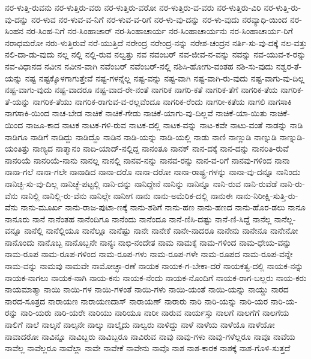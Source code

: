 {ನರ-ಳುತ್ತಿ-ರುವನು
ನರ-ಳುತ್ತಿರು-ವರು
ನರ-ಳುತ್ತಿರು-ವರೋ
ನರ-ಳುತ್ತಿರು-ವ-ವರು
ನರ-ಳುತ್ತಿರು-ವಿರಿ
ನರ-ಳುತ್ತಿ-ರು-ವು-ದನ್ನು
ನರ-ಳುವ
ನರ-ಳುವ-ವ-ನಿಗೆ
ನರ-ಳುವ-ವ-ರಿಗೆ
ನರ-ಳು-ವು-ದನ್ನು
ನರ-ಳು-ವುದು
ನರವ್ಯಾಧಿ-ಯಿಂದ
ನರ-ಸಿಂಹನ
ನರ-ಸಿಂಹ-ನಿಗೆ
ನರ-ಸಿಂಹಾಚಾರ್
ನರ-ಸಿಂಹಾಚಾರ್ಯ
ನರ-ಸಿಂಹಾಚಾರ್ಯನು
ನರ-ಸಿಂಹಾಚಾರ್ಯ-ರಿಗೆ
ನರಾಧಮರೋ
ನರು-ಳುತ್ತಿರುವೆ
ನರೆ-ಯುತ್ತಿದೆ
ನರೇಂದ್ರ
ನರೇಂದ್ರ-ನನ್ನು
ನರೇಶ-ಚಂದ್ರನ
ನರ್ತಿ-ಸು-ವು-ದಕ್ಕೆ
ನಲ-ವತ್ತು
ನಲಿ-ದಾ-ಡು-ವುದು
ನಲ್ಲ
ನಲ್ಲಿ
ನಲ್ಲಿ-ರುವ
ನಲ್ವತ್ತು
ನವ
ನವಂಬರ್
ನವ-ಜೀವ-ನ-ವನ್ನು
ನವನ್ನು
ನವ-ಯುವ-ಕ-ರನ್ನು
ನವ-ವಿಧಾನದ
ನವೀನ
ನವೀನ-ವಾಗಿ
ನವೆಂಬರ್
ನವೆಂಬರ್‌-ನಲ್ಲಿ
ನಶಿಸಿ-ಹೋಗು-ವಂತಹ
ನಶಿ-ಸು-ವುದು
ನಶ್ವರ-ತೆ-ಯನ್ನು
ನಷ್ಟ
ನಷ್ಟಕ್ಕೊಳಗಾಗುತ್ತೇವೆ
ನಷ್ಟ-ಗಳನ್ನೆಲ್ಲ
ನಷ್ಟ-ವನ್ನು
ನಷ್ಟ-ವಾಗಿ
ನಷ್ಟ-ವಾಗಿ-ರು-ವುದು
ನಷ್ಟ-ವಾಗು-ವು-ದಿಲ್ಲ
ನಷ್ಟ-ವಾಗು-ವುದು
ನಷ್ಟ-ವಾದರೂ
ನಷ್ಟ-ವಾದ-ರೇ-ನಂತೆ
ನಾಗರಿಕ
ನಾಗರಿ-ಕತೆ
ನಾಗರಿಕ-ತೆಗೆ
ನಾಗರಿಕ-ತೆಯ
ನಾಗರಿಕ-ತೆ-ಯನ್ನು
ನಾಗರಿಕ-ತೆಯು
ನಾಗರಿಕ-ರಾಗುವ-ವ-ರಲ್ಲವೆಂದೂ
ನಾಗರಿಕ-ರೆಂದು
ನಾಗರೀ-ಕತೆಯ
ನಾಗಲಿ
ನಾಗಸಾಕಿ
ನಾಗಸಾಕಿ-ಯಿಂದ
ನಾಚ-ಬೇಡ
ನಾಚಿಕೆ
ನಾಚಿಕೆ-ಗೇಡು
ನಾಚಿಕೆ-ಯಾಗು-ವು-ದಿಲ್ಲವೆ
ನಾಚಿಕೆ-ಯಾ-ಯಿತು
ನಾಚಿಕೆ-ಯಿಂದ
ನಾಜೂ-ಕಾದ
ನಾಟಕ
ನಾಟಕ-ಗಳಿ-ರುವ
ನಾಟಕ-ದಲ್ಲಿ
ನಾಟಕ-ವನ್ನು
ನಾಟ-ಕವೇ
ನಾಟು-ವಂತೆ
ನಾಡನ್ನು
ನಾಡಿ
ನಾಡಿಗೂ
ನಾಡಿಗೆ
ನಾಡಿದ್ದು
ನಾಡಿದ್ದೊ
ನಾಡಿನ
ನಾಡಿ-ಯನ್ನು
ನಾಡಿ-ಯಲ್ಲಿ
ನಾಡು
ನಾಣಿ
ನಾಣ್ಣುಡಿ
ನಾಣ್ನುಡಿ
ನಾಣ್ನುಡಿ-ಯಂತಿತ್ತು
ನಾಣ್ಯದ
ನಾತ್ಮಾನಂ
ನಾದಿ-ಯಾದ್‌-ನಲ್ಲಿದ್ದ
ನಾನಂತೂ
ನಾನಕ್
ನಾನ-ದಕ್ಕೆ
ನಾನ-ದನ್ನು
ನಾನರಿತಿ-ರುವೆ
ನಾನರಿಯೆ
ನಾನರಿಯೆ-ನಾನು
ನಾನಲ್ಲ
ನಾನಲ್ಲಿ
ನಾನವ-ನನ್ನು
ನಾನವ-ರನ್ನು
ನಾನ-ವ-ರಿಗೆ
ನಾನವು-ಗಳಿಂದ
ನಾನಾ
ನಾನಾ-ಗಲೆ
ನಾನಾ-ಗಲೇ
ನಾನಾಡಿದ
ನಾನಾ-ದರೊ
ನಾನಾ-ದರೋ
ನಾನಾ-ರಾಷ್ಟ್ರ-ಗಳನ್ನು
ನಾನಾ-ವು-ದನ್ನೂ
ನಾನಿಂದು
ನಾನಿಚ್ಛಿ-ಸು-ವು-ದಿಲ್ಲ
ನಾನಿಚ್ಛೆ-ಪಟ್ಟಲ್ಲಿ
ನಾನಿ-ದನ್ನು
ನಾನಿದ್ದೇನೆ
ನಾನಿನ್ನು
ನಾನಿನ್ನೂ
ನಾನಿ-ರುವ
ನಾನಿ-ರುವೆಡೆ
ನಾನಿ-ರು-ವೆನು
ನಾನಿಲ್ಲಿ
ನಾನಿಲ್ಲಿ-ರು-ವೆನು
ನಾನಿಲ್ಲೇ
ನಾನೀಗ
ನಾನು
ನಾನು-ಅಮೆರಿಕ-ದಲ್ಲಿ
ನಾನುಈ
ನಾನು-ನಿರೀಕ್ಷಿ-ಸುತ್ತಿ-ರು-ವೆನು
ನಾನು-ಮೂರ್ಖ
ನಾನು-ರಾಜ-ಪುಟಾ-ಣಕ್ಕೆ
ನಾನು-ಶಶಿಗೆ
ನಾನು-ಹಣ
ನಾನು-ಹಣದ
ನಾನು-ಹೊರ-ಡಲು
ನಾನೂ
ನಾನೂರು
ನಾನೆ
ನಾನೆಂತಹ
ನಾನೆಂದಿಗೂ
ನಾನೆಂದು
ನಾನೆಂದೂ
ನಾನೆ-ಣಿಸಿ-ದಷ್ಟು
ನಾನೆ-ಣಿ-ಸಿದ್ದೆ
ನಾನೆಲ್ಲ
ನಾನೆಲ್ಲ-ವನ್ನೂ
ನಾನೆಲ್ಲಿ
ನಾನೆಲ್ಲಿಯೂ
ನಾನೆಲ್ಲೂ
ನಾನೆಷ್ಟು
ನಾನೇ
ನಾನೇಕೆ
ನಾನೇ-ನಾದರೂ
ನಾನೇನು
ನಾನೇನೂ
ನಾನೇನೋ
ನಾನೊಂದು
ನಾನೊಬ್ಬ
ನಾನೊಬ್ಬನೇ
ನಾನ್ಯಃ
ನಾಭಿ-ನಂದೇತ
ನಾಮ
ನಾಮಕ್ಕೆ
ನಾಮ-ಗಳಿಂದ
ನಾಮ-ಧೇಯ-ವನ್ನು
ನಾಮ-ರೂಪ
ನಾಮ-ರೂಪ-ಗಳಿಂದ
ನಾಮ-ರೂಪ-ಗಳು
ನಾಮ-ರೂಪ-ಗಳೇ
ನಾಮ-ರೂಪದ
ನಾಮ-ರೂಪ-ವನ್ನೇ
ನಾಮ-ವನ್ನು
ನಾಮವು
ನಾಮವೇ
ನಾಮೋಚ್ಛಾ-ರಣೆ
ನಾಯಕ
ನಾಯಕ-ಗ-ಬೇಕಾ-ದರೆ
ನಾಯಕತ್ವ-ದಲ್ಲಿ
ನಾಯಕ-ನನ್ನು
ನಾಯಕ-ನಾಗಲು
ನಾಯಕ-ನಾಗಿ
ನಾಯ-ಕನು
ನಾಯಕ-ನೆಂದು
ನಾಯಕ-ನೊಂದಿಗೆ
ನಾಯಕ-ರಾಗ-ಬಲ್ಲರು
ನಾಯ-ಕರು
ನಾಯಮಾತ್ಮಾ
ನಾಯಿ
ನಾಯಿ-ಗಳ
ನಾಯಿ-ಗಳಂತೆ
ನಾಯಿ-ಗಳು
ನಾಯಿ-ಯಂತೆ
ನಾಯಿ-ಯನ್ನು
ನಾಯ್ಡು
ನಾರದ
ನಾರದ-ಸೂತ್ರದ
ನಾರಾಯಣ
ನಾರಾಯಣದಾಸ್
ನಾರಾಯಣ್
ನಾರಾರು
ನಾರಿ
ನಾರಿ-ಯನ್ನು
ನಾರಿ-ಯರ
ನಾರಿ-ಯ-ರನ್ನು
ನಾರಿ-ಯರು
ನಾರಿ-ಯರೇ
ನಾರಿಯು
ನಾರಿಯೂ
ನಾರೀ
ನಾರುವ
ನಾರ್ಯಸ್ತು
ನಾಲಗೆ
ನಾಲಗೆಗೆ
ನಾಲಗೆಯ
ನಾಲಿಗೆ
ನಾಲೆ
ನಾಲ್ಕನೆ
ನಾಲ್ಕನೇ
ನಾಲ್ಕು
ನಾಲ್ಕೈದು
ನಾಲ್ವರು
ನಾಳಿದ್ದು
ನಾಳೆ
ನಾಳೆಯ
ನಾಳೆಯೊ
ನಾಳೆಯೋ
ನಾವಾದರೋ
ನಾವಿನ್ನೂ
ನಾವಿಬ್ಬರು
ನಾವಿಬ್ಬರೂ
ನಾವಿರುವ
ನಾವು
ನಾವು-ಗಳು
ನಾವು-ಗಳೆಲ್ಲರೂ
ನಾವೂ
ನಾವೆಯ
ನಾವೆಲ್ಲ
ನಾವೆಲ್ಲರೂ
ನಾವೆಲ್ಲಾ
ನಾವೇ
ನಾವೇಕೆ
ನಾವೇನು
ನಾವೊ
ನಾಶ
ನಾಶ-ಕಾರಕ
ನಾಶಕ್ಕೆ
ನಾಶ-ಗೊಳಿ-ಸುತ್ತದೆ
}
